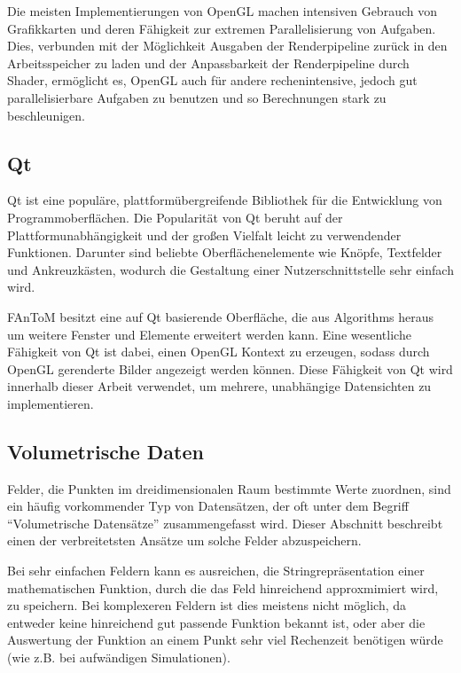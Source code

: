 \documentclass[a4paper,fontsize=12pt,toc=bib,halfparskip]{scrartcl}
\begin{document}
Die meisten Implementierungen von OpenGL machen intensiven Gebrauch von Grafikkarten und deren F\"ahigkeit zur extremen Parallelisierung von Aufgaben. Dies, verbunden mit der M\"oglichkeit Ausgaben der Renderpipeline zur\"uck in den Arbeitsspeicher zu laden und der Anpassbarkeit der Renderpipeline durch Shader, erm\"oglicht es, OpenGL auch f\"ur andere rechenintensive, jedoch gut parallelisierbare Aufgaben zu benutzen und so Berechnungen stark zu beschleunigen.

\subsection{Qt}
Qt\cite{qtWebsite} ist eine popul\"are, plattform\"ubergreifende Bibliothek f\"ur die Entwicklung von Programmoberfl\"achen. Die Popularit\"at von Qt beruht auf der Plattformunabh\"angigkeit und der gro{\ss}en Vielfalt leicht zu verwendender Funktionen. Darunter sind beliebte Oberfl\"achenelemente wie Kn\"opfe, Textfelder und Ankreuzk\"asten, wodurch die Gestaltung einer Nutzerschnittstelle sehr einfach wird.

FAnToM besitzt eine auf Qt basierende Oberfl\"ache, die aus Algorithms heraus um weitere Fenster und Elemente erweitert werden kann. Eine wesentliche F\"ahigkeit von Qt ist dabei, einen OpenGL Kontext zu erzeugen, sodass durch OpenGL gerenderte Bilder angezeigt werden k\"onnen. Diese F\"ahigkeit von Qt wird innerhalb dieser Arbeit verwendet, um mehrere, unabh\"angige Datensichten zu implementieren.

\subsection{Volumetrische Daten}
Felder, die Punkten im dreidimensionalen Raum bestimmte Werte zuordnen, sind ein h\"aufig vorkommender Typ von Datens\"atzen, der oft unter dem Begriff ``Volumetrische Datens\"atze'' zusammengefasst wird. Dieser Abschnitt beschreibt einen der verbreitetsten Ans\"atze um solche Felder abzuspeichern.  

Bei sehr einfachen Feldern kann es ausreichen, die Stringrepr\"asentation einer mathematischen Funktion, durch die das Feld hinreichend approxmimiert wird, zu speichern. Bei komplexeren Feldern ist dies meistens nicht m\"oglich, da entweder keine hinreichend gut passende Funktion bekannt ist, oder aber die Auswertung der Funktion an einem Punkt sehr viel Rechenzeit ben\"otigen w\"urde (wie z.B. bei aufw\"andigen Simulationen). 
\end{document}
